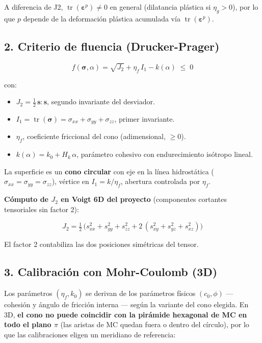 \documentclass[11pt,letterpaper,oneside]{report}
\begin{document}
A diferencia de J2, $\operatorname{tr}(\boldsymbol\varepsilon^p) \neq 0$ en general (dilatancia plástica si $\eta_g > 0$), por lo que $p$ depende de la deformación plástica acumulada vía $\operatorname{tr}(\boldsymbol\varepsilon^p)$.

\subsection{2. Criterio de fluencia (Drucker-Prager)}

\[
f(\boldsymbol\sigma, \alpha) = \sqrt{J_2} + \eta_f\,I_1 - k(\alpha) \;\leq\; 0
\]

con:

\begin{itemize}
  \item $J_2 = \tfrac{1}{2}\,\mathbf s : \mathbf s$, segundo invariante del desviador.
  \item $I_1 = \operatorname{tr}(\boldsymbol\sigma) = \sigma_{xx} + \sigma_{yy} + \sigma_{zz}$, primer invariante.
  \item $\eta_f$, coeficiente friccional del cono (adimensional, $\geq 0$).
  \item $k(\alpha) = k_0 + H_k\,\alpha$, parámetro cohesivo con endurecimiento isótropo lineal.
\end{itemize}

La superficie es un \textbf{cono circular} con eje en la línea hidrostática ($\sigma_{xx} = \sigma_{yy} = \sigma_{zz}$), vértice en $I_1 = k/\eta_f$, abertura controlada por $\eta_f$.

\textbf{Cómputo de $J_2$ en Voigt 6D del proyecto} (componentes cortantes tensoriales sin factor 2):

\[
J_2 = \tfrac{1}{2}\,\Big(s_{xx}^2 + s_{yy}^2 + s_{zz}^2 + 2\,(s_{xy}^2 + s_{yz}^2 + s_{xz}^2)\Big)
\]

El factor 2 contabiliza las dos posiciones simétricas del tensor.

\subsection{3. Calibración con Mohr-Coulomb (3D)}

Los parámetros $(\eta_f, k_0)$ se derivan de los parámetros físicos $(c_0, \phi)$ --- cohesión y ángulo de fricción interna --- según la variante del cono elegida. En 3D, \textbf{el cono no puede coincidir con la pirámide hexagonal de MC en todo el plano \ensuremath{\pi}} (las aristas de MC quedan fuera o dentro del círculo), por lo que las calibraciones eligen un meridiano de referencia:
\end{document}
